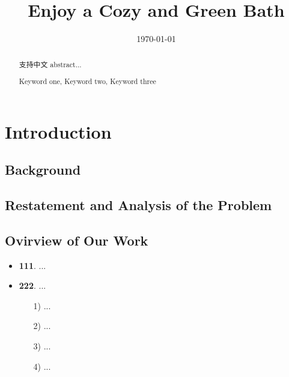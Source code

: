 \documentclass{mcmthesis}
\title{Enjoy a Cozy and Green Bath}
\date{\today}
\begin{document}
\begin{abstract}
支持中文
abstract...

\begin{keywords}
	Keyword one, Keyword two, Keyword three
\end{keywords}

\end{abstract}


\maketitle
\tableofcontents        %
\thispagestyle{empty}
\newpage







\section{Introduction}
\subsection{Background}
\subsection{Restatement and Analysis of the Problem}
\subsection{Ovirview of Our Work}

\begin{itemize}
	\item {\bf 111}. ...
	\item {\bf 222}. ...
	
	\begin{itemize}
		\item[1)] ... 
		\item[2)] ...
		\item[3)] ...
		\item[4)] ...
	\end{itemize}
	
\end{itemize}
\end{document}
